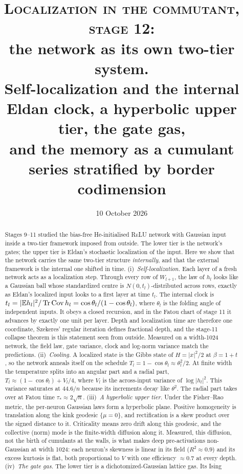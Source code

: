 \documentclass[11pt]{article}
\title{\textsc{Localization in the commutant, stage 12:}\\ \large the network as its own two-tier system.\\
Self-localization and the internal Eldan clock, a hyperbolic upper tier, the gate gas,\\ and the memory as a cumulant series
stratified by border codimension}
\author{}
\date{10 October 2026}
\theoremstyle{plain}
\theoremstyle{definition}\newtheorem{definition}[theorem]{Definition}\newtheorem{remark}[theorem]{Remark}
\newcommand{\Tr}{\operatorname{Tr}}\newcommand{\1}{\mathbf 1}\newcommand{\cA}{\mathcal A}\newcommand{\cB}{\mathcal B}
\begin{document}
\maketitle
\begin{abstract}
Stages 9--11 studied the bias-free He-initialised \textsc{ReLU} network with Gaussian input inside a two-tier framework imposed from
outside. The lower tier is the network's gates; the upper tier is Eldan's stochastic localization of the input. Here we show that
the network carries the same two-tier structure \emph{internally}, and that the external framework is the internal one shifted in
time. (i)~\emph{Self-localization.} Each layer of a fresh network acts as a localization step. Through every row of $W_{l+1}$, the law
of $h_l$ looks like a Gaussian ball whose standardized centre is $N(0,t_l)$-distributed across rows, exactly as Eldan's localized
input looks to a first layer at time $t_l$. The internal clock is $t_l=|\E h_l|^2/\Tr\Cov h_l=\cos\theta_l/(1-\cos\theta_l)$, where
$\theta_l$ is the folding angle of independent inputs. It obeys a closed recursion, and in the Fatou chart of stage 11 it advances by
exactly one unit per layer. Depth and localization time are therefore one coordinate, Szekeres' regular iteration defines fractional
depth, and the stage-11 collapse theorem is this statement seen from outside. Measured on a width-1024 network, the field law,
gate variance, clock and log-norm variance match the predictions. (ii)~\emph{Cooling.} A localized state is the Gibbs state of
$H=|x|^2/2$ at $\beta=1+t$, so the network anneals itself on the schedule $T_l=1-\cos\theta_l\approx\theta_l^2/2$. At finite width
the temperature splits into an angular part and a radial part, $T_l\approx(1-\cos\theta_l)+V_l/4$, where $V_l$ is the across-input
variance of $\log|h_l|^2$. This variance saturates at $44.6/n$ because its increments decay like $\theta^2$. The radial part takes
over at Fatou time $\tau_*\approx2\sqrt n$. (iii)~\emph{A hyperbolic upper tier.} Under the Fisher--Rao metric, the per-neuron
Gaussian laws form a hyperbolic plane. Positive homogeneity is translation along the kink geodesic $\{\mu=0\}$, and rectification is
a skew product over the signed distance to it. Criticality means zero drift along this geodesic, and the collective (norm) mode is
the finite-width diffusion along it. Measured, this diffusion, not the birth of cumulants at the walls, is what makes deep
pre-activations non-Gaussian at width 1024: each neuron's skewness is linear in its field ($R^2\approx0.9$) and its excess kurtosis is
flat, both proportional to $V$ with one efficiency $\approx0.7$ at every depth. (iv)~\emph{The gate gas.} The lower tier is a dichotomized-Gaussian lattice gas. Its Ising

\end{abstract}
\end{document}
